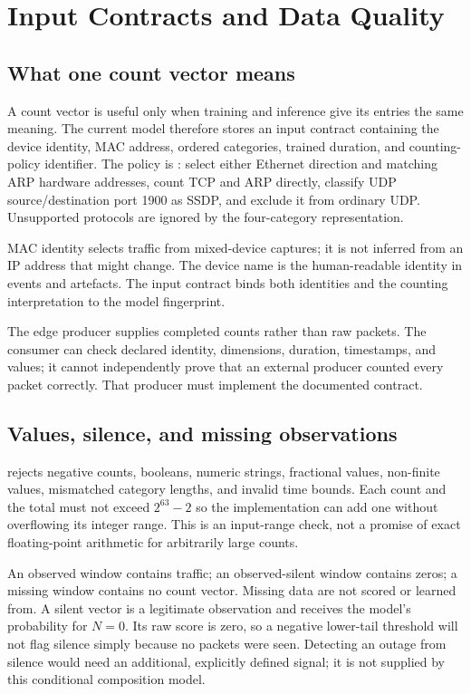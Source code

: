 \section{Input Contracts and Data Quality}

\subsection{What one count vector means}

A count vector is useful only when training and inference give its entries the
same meaning. The current model therefore stores an input contract containing
the device identity, MAC address, ordered categories, trained duration, and
counting-policy identifier. The policy is
: select either Ethernet
direction and matching ARP hardware addresses, count TCP and ARP directly,
classify UDP source/destination port 1900 as SSDP, and exclude it from ordinary
UDP. Unsupported protocols are ignored by the four-category representation.

MAC identity selects traffic from mixed-device captures; it is not inferred
from an IP address that might change. The device name is the human-readable
identity in events and artefacts. The input contract binds both identities and
the counting interpretation to the model fingerprint.

The edge producer supplies completed counts rather than raw packets. The
consumer can check declared identity, dimensions, duration, timestamps, and
values; it cannot independently prove that an external producer counted every
packet correctly. That producer must implement the documented contract.

\subsection{Values, silence, and missing observations}

 rejects negative counts, booleans, numeric strings,
fractional values, non-finite values, mismatched category lengths, and invalid
time bounds. Each count and the total must not exceed $2^{63}-2$ so the
implementation can add one without overflowing its integer range.
This is an input-range check, not a promise of exact floating-point arithmetic
for arbitrarily large counts.

An observed window contains traffic; an observed-silent window contains zeros;
a missing window contains no count vector. Missing data are not scored or
learned from. A silent vector is a legitimate observation and receives the
model's probability for $N=0$. Its raw score is zero, so a negative lower-tail
threshold will not flag silence simply because no packets were seen.
Detecting an outage from silence would need an additional, explicitly defined
signal; it is not supplied by this conditional composition model.

